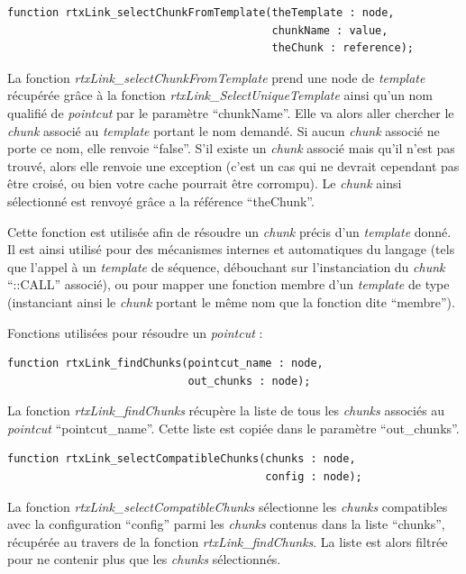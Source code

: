 \documentclass[french]{rtxreport}
\begin{document}
\begin{lstlisting}
function rtxLink_selectChunkFromTemplate(theTemplate : node,
                                         chunkName : value,
                                         theChunk : reference);
\end{lstlisting}
La fonction \emph{rtxLink\_selectChunkFromTemplate} prend une node de
\emph{template} récupérée grâce à la fonction
\emph{rtxLink\_SelectUniqueTemplate} ainsi qu'un nom qualifié de
\emph{pointcut} par le paramètre ``chunkName''. Elle va alors aller chercher le
\emph{chunk} associé au \emph{template} portant le nom demandé. Si aucun
\emph{chunk} associé ne porte ce nom, elle renvoie ``false''. S'il existe un
\emph{chunk} associé mais qu'il n'est pas trouvé, alors elle renvoie une
exception (c'est un cas qui ne devrait cependant pas être croisé, ou bien votre
cache pourrait être corrompu). Le \emph{chunk} ainsi sélectionné est renvoyé
grâce a la référence ``theChunk''.

Cette fonction est utilisée afin de résoudre un \emph{chunk} précis d'un
\emph{template} donné. Il est ainsi utilisé pour des mécanismes internes et
automatiques du langage (tels que l'appel à un \emph{template} de séquence,
débouchant sur l'instanciation du \emph{chunk} ``::CALL'' associé), ou pour
mapper une fonction membre d'un \emph{template} de type (instanciant ainsi le
\emph{chunk} portant le même nom que la fonction dite ``membre'').

\vspace{20pt}

Fonctions utilisées pour résoudre un \emph{pointcut} :
\begin{lstlisting}
function rtxLink_findChunks(pointcut_name : node,
                            out_chunks : node);
\end{lstlisting}
La fonction \emph{rtxLink\_findChunks} récupère la liste de tous les
\emph{chunks} associés au \emph{pointcut} ``pointcut\_name''. Cette liste est
copiée dans le paramètre ``out\_chunks''.


\begin{lstlisting}
function rtxLink_selectCompatibleChunks(chunks : node,
                                        config : node);
\end{lstlisting}
La fonction \emph{rtxLink\_selectCompatibleChunks} sélectionne les
\emph{chunks} compatibles avec la configuration ``config'' parmi les
\emph{chunks} contenus dans la liste ``chunks'', récupérée au travers de la
fonction \emph{rtxLink\_findChunks}. La liste est alors filtrée pour ne
contenir plus que les \emph{chunks} sélectionnés.
\end{document}
